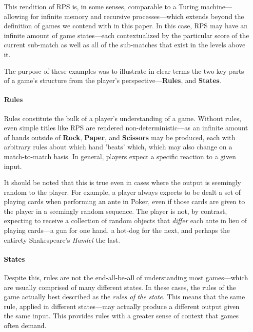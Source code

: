 \documentclass{report}
\newcommand{\state}[1]{\textbf{#1}}
\begin{document}
This rendition of RPS is, in some senses, comparable to a Turing machine---allowing for infinite memory and recursive processes---which extends beyond the definition of games we contend with in this paper. In this case, RPS may have an infinite amount of game states---each contextualized by the particular score of the current sub-match as well as all of the sub-matches that exist in the levels above it. 

The purpose of these examples was to illustrate in clear terms the two key parts of a game's structure from the player's perspective---\state{Rules}, and \state{States}.

\paragraph{Rules}

Rules constitute the bulk of a player's understanding of a game. Without rules, even simple titles like RPS are rendered non-deterministic---as an infinite amount of hands outside of \state{Rock}, \state{Paper}, and \state{Scissors} may be produced, each with arbitrary rules about which hand 'beats' which, which may also change on a match-to-match basis. In general, players expect a specific reaction to a given input. 

It should be noted that this is true even in cases where the output is seemingly random to the player. For example, a player always expects to be dealt a set of playing cards when performing an ante in Poker, even if those cards are given to the player in a seemingly random sequence. The player is not, by contrast, expecting to receive a collection of random objects that \emph{differ} each ante in lieu of playing cards---a gun for one hand, a hot-dog for the next, and perhaps the entirety Shakespeare's \emph{Hamlet} the last. 

\paragraph{States}

Despite this, rules are not the end-all-be-all of understanding most games---which are usually comprised of many different states. In these cases, the rules of the game actually best described as the \emph{rules of the state.} This means that the same rule, applied in different states---may actually produce a different output given the same input. This provides rules with a greater sense of context that games often demand. 
\end{document}
